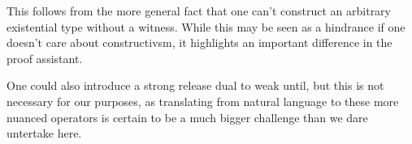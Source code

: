 \documentclass{article}
\begin{document}
\begin{code}%
%
\>[2]\AgdaSpace{}%
\AgdaSymbol{:}\AgdaSpace{}%
\AgdaSymbol{\{}\AgdaSymbol{\}}\AgdaSpace{}%
\AgdaSpace{}%
\AgdaSpace{}%
\AgdaSpace{}%
\AgdaSpace{}%
\AgdaSpace{}%
\<%
\\
%
\>[2]\AgdaSpace{}%
\AgdaSymbol{\{}\AgdaSymbol{\}}\AgdaSpace{}%
\AgdaSpace{}%
\AgdaSpace{}%
\AgdaSymbol{=}\AgdaSpace{}%
\AgdaSpace{}%
\AgdaSpace{}%
\AgdaSpace{}%
\AgdaSpace{}%
\AgdaSpace{}%
\AgdaSpace{}%
\<%
\\
%
\\[\AgdaEmptyExtraSkip]%
%
\>[2]\<%
\\
%
\>[2]\<%
\\
\>[2][@{}l@{\AgdaIndent{0}}]%
\>[4]\AgdaSpace{}%
\AgdaSymbol{:}\AgdaSpace{}%
\AgdaSymbol{\{}\AgdaSpace{}%
\AgdaSymbol{:}\AgdaSpace{}%
\AgdaSymbol{\}}\AgdaSpace{}%
\AgdaSymbol{\{}\AgdaSpace{}%
\AgdaSymbol{:}\AgdaSpace{}%
\AgdaSymbol{\}}\AgdaSpace{}%
\AgdaSpace{}%
\AgdaSpace{}%
\AgdaSymbol{\{}\AgdaSymbol{\}}\AgdaSpace{}%
\AgdaSymbol{(}\AgdaSpace{}%
\AgdaSymbol{(}\AgdaSpace{}%
\AgdaSymbol{))}\AgdaSpace{}%
\AgdaSymbol{(}\AgdaSpace{}%
\AgdaSymbol{(}\AgdaSpace{}%
\AgdaSymbol{))}\<%
\end{code}

This follows from the more general fact that one can't construct an arbitrary
existential type without a witness. While this may be seen as a hindrance if one
doesn't care about constructivsm, it highlights an important difference in the
proof assistant.

One could also introduce a strong release dual to weak until, but this is not
necessary for our purposes, as translating from natural language to these more
nuanced operators is certain to be a much bigger challenge than we dare
untertake here.
\end{document}
